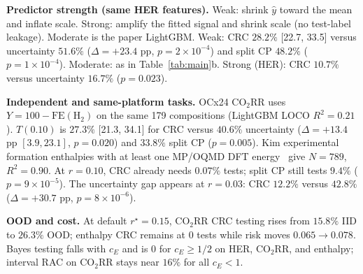 \documentclass{article}
\begin{document}
\textbf{Predictor strength (same HER features).}
Weak: shrink $\hat y$ toward the mean and inflate scale.
Strong: amplify the fitted signal and shrink scale (no test-label leakage).
Moderate is the paper LightGBM.
Weak: CRC $28.2\%$ [22.7, 33.5] versus uncertainty $51.6\%$ ($\Delta=+23.4$ pp, $p=2{\times}10^{-4}$) and split CP $48.2\%$ ($p=1{\times}10^{-4}$).
Moderate: as in Table~\ref{tab:main}b.
Strong (HER): CRC $10.7\%$ versus uncertainty $16.7\%$ ($p=0.023$).

\textbf{Independent and same-platform tasks.}
OCx24 CO$_2$RR uses $Y=100-\mathrm{FE}(\mathrm{H}_2)$ on the same 179 compositions (LightGBM LOCO $R^2=0.21$).
$T(0.10)$ is $27.3\%$ [21.3, 34.1] for CRC versus $40.6\%$ uncertainty ($\Delta=+13.4$ pp $[3.9,23.1]$, $p=0.020$) and $33.8\%$ split CP ($p=0.005$).
Kim experimental formation enthalpies with at least one MP/OQMD DFT energy~\citep{kim2017enthalpy} give $N=789$, $R^2=0.90$.
At $r=0.10$, CRC already needs $0.07\%$ tests; split CP still tests $9.4\%$ ($p=9{\times}10^{-5}$).
The uncertainty gap appears at $r=0.03$: CRC $12.2\%$ versus $42.8\%$ ($\Delta=+30.7$ pp, $p=8{\times}10^{-6}$).

\textbf{OOD and cost.}
At default $r^\star=0.15$, CO$_2$RR CRC testing rises from $15.8\%$ IID to $26.3\%$ OOD; enthalpy CRC remains at $0$ tests while risk moves $0.065\to 0.078$.
Bayes testing falls with $c_E$ and is $0$ for $c_E\ge 1/2$ on HER, CO$_2$RR, and enthalpy; interval RAC on CO$_2$RR stays near $16\%$ for all $c_E<1$.
\end{document}
